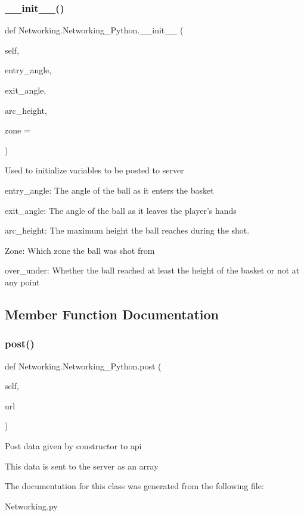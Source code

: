 \subsubsection{\texorpdfstring{\+\_\+\+\_\+init\+\_\+\+\_\+()}{\_\_init\_\_()}}
{\footnotesize\ttfamily def Networking.\+Networking\+\_\+\+Python.\+\_\+\+\_\+init\+\_\+\+\_\+ (\begin{DoxyParamCaption}\item[{}]{self,  }\item[{}]{entry\+\_\+angle,  }\item[{}]{exit\+\_\+angle,  }\item[{}]{arc\+\_\+height,  }\item[{}]{zone = {} }\end{DoxyParamCaption})}

\begin{DoxyVerb}Used to initialize variables to be posted to server\end{DoxyVerb}
\begin{DoxyVerb}entry_angle: The angle of the ball as it enters the basket\end{DoxyVerb}
\begin{DoxyVerb}exit_angle: The angle of the ball as it leaves the player's hands\end{DoxyVerb}
\begin{DoxyVerb}arc_height: The maximum height the ball reaches during the shot.\end{DoxyVerb}
\begin{DoxyVerb}Zone: Which zone the ball was shot from\end{DoxyVerb}
\begin{DoxyVerb}over_under: Whether the ball reached at least the height of the basket or not at any point\end{DoxyVerb}
 

\subsection{Member Function Documentation}
\mbox{\label{classNetworking_1_1Networking__Python_a56516bc36d4a0991e4a4c90ae8248e48}} 
\subsubsection{\texorpdfstring{post()}{post()}}
{\footnotesize\ttfamily def Networking.\+Networking\+\_\+\+Python.\+post (\begin{DoxyParamCaption}\item[{}]{self,  }\item[{}]{url }\end{DoxyParamCaption})}

\begin{DoxyVerb}Post data given by constructor to api \end{DoxyVerb}
\begin{DoxyVerb}This data is sent to the server as an array\end{DoxyVerb}
 

The documentation for this class was generated from the following file\+:\begin{DoxyCompactItemize}
\item 
Networking.\+py\end{DoxyCompactItemize}
